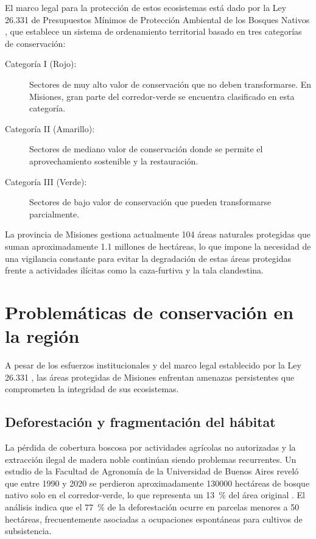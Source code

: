 \documentclass[a4paper, 12pt]{report}
\begin{document}
El marco legal para la protección de estos ecosistemas está dado por la
Ley 26.331 de Presupuestos Mínimos de Protección Ambiental de los Bosques
Nativos \cite{ley26331bosques}, que establece un sistema de ordenamiento
territorial basado en tres categorías de conservación:

\begin{description}
  \item[Categoría I (Rojo):] Sectores de muy alto valor de conservación que
    no deben transformarse. En Misiones, gran parte del \gls{corredor-verde}
    se encuentra clasificado en esta categoría.
  \item[Categoría II (Amarillo):] Sectores de mediano valor de conservación
    donde se permite el aprovechamiento sostenible y la restauración.
  \item[Categoría III (Verde):] Sectores de bajo valor de conservación que
    pueden transformarse parcialmente.
\end{description}

La provincia de Misiones gestiona actualmente \num{104} áreas naturales protegidas
que suman aproximadamente \num{1.1} millones de hectáreas, lo que impone la necesidad
de una vigilancia constante para evitar la degradación de estas áreas protegidas
frente a actividades ilícitas como la \gls{caza-furtiva} y la tala clandestina.

\section{Problemáticas de conservación en la región}

A pesar de los esfuerzos institucionales y del marco legal establecido por la
Ley 26.331 \cite{ley26331bosques}, las áreas protegidas de Misiones enfrentan
amenazas persistentes que comprometen la integridad de sus ecosistemas.

\subsection{Deforestación y fragmentación del hábitat}

La pérdida de cobertura boscosa por actividades agrícolas no autorizadas y la
extracción ilegal de madera noble continúan siendo problemas recurrentes. Un
estudio de la Facultad de Agronomía de la Universidad de Buenos Aires reveló
que entre 1990 y 2020 se perdieron aproximadamente \num{130000} hectáreas de bosque
nativo solo en el \gls{corredor-verde}, lo que representa un \qty{13}{\percent} del área
original \cite{fauba2024corredorverde}. El análisis indica que el \qty{77}{\percent} de la
deforestación ocurre en parcelas menores a \num{50} hectáreas, frecuentemente
asociadas a ocupaciones espontáneas para cultivos de subsistencia.
\end{document}
